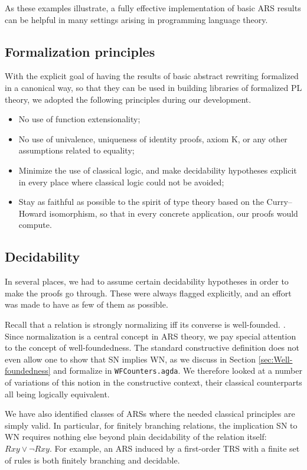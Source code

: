 As these examples illustrate, a fully effective implementation of basic ARS results
can be helpful in many settings arising in programming language theory.

\subsection{Formalization principles}
With the explicit goal of having the results of basic abstract rewriting
formalized in a canonical way, so that they can be used in building
libraries of formalized PL theory, we adopted the following
principles during our development.

\begin{itemize}
  \item No use of function extensionality;
  \item No use of univalence, uniqueness of identity proofs, axiom K, or any other
  assumptions related to equality;
  \item Minimize the use of classical logic, and make decidability hypotheses explicit in every place where classical logic could not be avoided;
  \item Stay as faithful as possible to the spirit of type theory based on the Curry--Howard isomorphism, so that in every concrete application, our proofs would compute.
\end{itemize}

\subsection{Decidability}
In several places, we had to assume certain decidability hypotheses in order to make
the proofs go through.  These were always flagged explicitly, and an effort was made to
have as few of them as possible.

Recall that a relation is strongly normalizing iff its converse is well-founded. \cite[Def.1.1.13]{Terese}.
Since normalization is a central concept in ARS theory,
we pay special attention to the concept of well-foundedness.
The standard constructive definition does not even allow one to show that SN implies WN, 
as we discuss in Section \ref{sec:Well-foundedness} and formalize in \texttt{WFCounters.agda}.
We therefore looked at a number of variations of this notion in the constructive context, 
their classical counterparts all being logically equivalent. %

We have also identified classes of ARSs where the needed classical principles are simply valid.  In particular, for finitely branching relations, the implication SN to WN requires nothing else beyond plain decidability of the relation itself: $Rxy \lor \lnot Rxy$.  For example, an ARS induced by a first-order TRS with a finite set of rules is both finitely branching and decidable.

